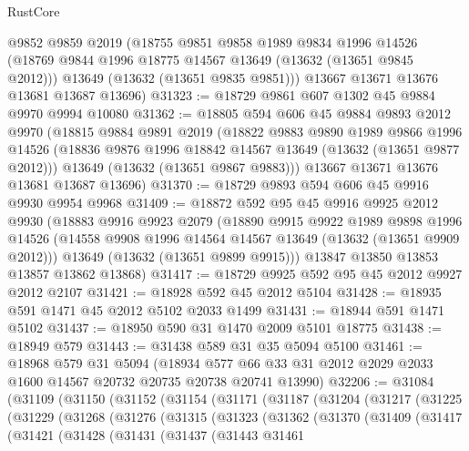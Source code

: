 \begin{lexlean}{RustCore}
\begin{coremodule}
      @9852
      @9859
      @2019
      (@18755
        @9851
        @9858
        @1989
        @9834
        @1996
        @14526
        (@18769 @9844 @1996 @18775 @14567 @13649 (@13632 (@13651 @9845 @2012)))
        @13649
        (@13632 (@13651 @9835 @9851)))
      @13667
      @13671
      @13676
      @13681
      @13687
      @13696)
@31323 := @18729 @9861 @607 @1302 @45 @9884 @9970 @9994 @10080
@31362 := @18805
    @594
    @606
    @45
    @9884
    @9893
    @2012
    @9970
    (@18815
      @9884
      @9891
      @2019
      (@18822
        @9883
        @9890
        @1989
        @9866
        @1996
        @14526
        (@18836 @9876 @1996 @18842 @14567 @13649 (@13632 (@13651 @9877 @2012)))
        @13649
        (@13632 (@13651 @9867 @9883)))
      @13667
      @13671
      @13676
      @13681
      @13687
      @13696)
@31370 := @18729 @9893 @594 @606 @45 @9916 @9930 @9954 @9968
@31409 := @18872
    @592
    @95
    @45
    @9916
    @9925
    @2012
    @9930
    (@18883
      @9916
      @9923
      @2079
      (@18890
        @9915
        @9922
        @1989
        @9898
        @1996
        @14526
        (@14558 @9908 @1996 @14564 @14567 @13649 (@13632 (@13651 @9909 @2012)))
        @13649
        (@13632 (@13651 @9899 @9915)))
      @13847
      @13850
      @13853
      @13857
      @13862
      @13868)
@31417 := @18729 @9925 @592 @95 @45 @2012 @9927 @2012 @2107
@31421 := @18928 @592 @45 @2012 @5104
@31428 := @18935 @591 @1471 @45 @2012 @5102 @2033 @1499
@31431 := @18944 @591 @1471 @5102
@31437 := @18950 @590 @31 @1470 @2009 @5101 @18775
@31438 := @18949 @579
@31443 := @31438 @589 @31 @35 @5094 @5100
@31461 := @18968
    @579
    @31
    @5094
    (@18934 @577 @66 @33 @31 @2012 @2029 @2033 @1600 @14567 @20732 @20735 @20738 @20741 @13990)
@32206 := @31084
    (@31109
      (@31150
        (@31152
          (@31154
            (@31171
              (@31187
                (@31204
                  (@31217
                    (@31225
                      (@31229
                        (@31268
                          (@31276
                            (@31315
                              (@31323
                                (@31362
                                  (@31370
                                    (@31409
                                      (@31417
                                        (@31421
                                          (@31428
                                            (@31431
                                              (@31437
                                                (@31443
                                                  @31461

\end{coremodule}
\end{lexlean}
